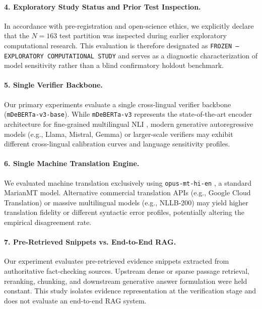 \paragraph{4. Exploratory Study Status and Prior Test Inspection.}
In accordance with pre-registration and open-science ethics, we explicitly declare that the $N=163$ test partition was inspected during earlier exploratory computational research. This evaluation is therefore designated as \texttt{FROZEN — EXPLORATORY COMPUTATIONAL STUDY} and serves as a diagnostic characterization of model sensitivity rather than a blind confirmatory holdout benchmark.

\paragraph{5. Single Verifier Backbone.}
Our primary experiments evaluate a single cross-lingual verifier backbone (\texttt{mDeBERTa-v3-base}). While \texttt{mDeBERTa-v3} represents the state-of-the-art encoder architecture for fine-grained multilingual NLI \citep{laurer-etal-2024-less,shcharbakova-etal-2025-scale}, modern generative autoregressive models (e.g., Llama, Mistral, Gemma) or larger-scale verifiers may exhibit different cross-lingual calibration curves and language sensitivity profiles.

\paragraph{6. Single Machine Translation Engine.}
We evaluated machine translation exclusively using \texttt{opus-mt-hi-en} \citep{tiedemann-thottingal-2020-opus}, a standard MarianMT model. Alternative commercial translation APIs (e.g., Google Cloud Translation) or massive multilingual models (e.g., NLLB-200) may yield higher translation fidelity or different syntactic error profiles, potentially altering the empirical disagreement rate.

\paragraph{7. Pre-Retrieved Snippets vs. End-to-End RAG.}
Our experiment evaluates pre-retrieved evidence snippets extracted from authoritative fact-checking sources. Upstream dense or sparse passage retrieval, reranking, chunking, and downstream generative answer formulation were held constant. This study isolates evidence representation at the verification stage and does not evaluate an end-to-end RAG system.

